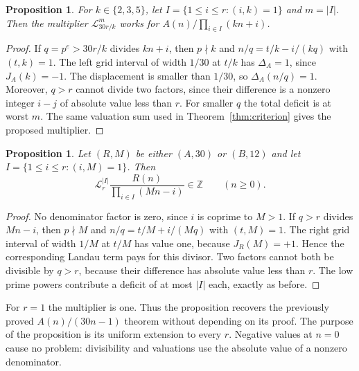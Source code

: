 \documentclass[11pt]{article}
\newtheorem{proposition}[theorem]{Proposition}
\theoremstyle{definition}
\theoremstyle{remark}
\newcommand{\Z}{\mathbb Z}
\newcommand{\LL}{\mathcal L}
\begin{document}
\begin{proposition}\label{prop:positive}
For $k\in\{2,3,5\}$, let $I=\{1\leq i\leq r:(i,k)=1\}$ and
$m=|I|$. Then the multiplier $\LL_{30r/k}^{m}$ works for
$A(n)/\prod_{i\in I}(kn+i)$.
\end{proposition}
\begin{proof}
If $q=p^e>30r/k$ divides $kn+i$, then $p\nmid k$ and
$n/q=t/k-i/(kq)$ with $(t,k)=1$. The left grid interval of width
$1/30$ at $t/k$ has $\Delta_A=1$, since $J_A(k)=-1$. The displacement
is smaller than $1/30$, so $\Delta_A(n/q)=1$.
Moreover, $q>r$ cannot divide two factors, since their difference is
a nonzero integer $i-j$ of absolute value less than $r$.
For smaller $q$ the total deficit is at worst $m$. The same valuation
sum used in Theorem~\ref{thm:criterion} gives the proposed multiplier.
\end{proof}

\begin{proposition}\label{prop:negative}
Let $(R,M)$ be either $(A,30)$ or $(B,12)$ and let
$I=\{1\leq i\leq r:(i,M)=1\}$. Then
\begin{equation}\label{eq:negativeboth}
 \LL_r^{|I|}\frac{R(n)}{\prod_{i\in I}(Mn-i)}\in\Z
 \qquad(n\geq0).
\end{equation}
\end{proposition}
\begin{proof}
No denominator factor is zero, since $i$ is coprime to $M>1$.
If $q>r$ divides $Mn-i$, then $p\nmid M$ and
$n/q=t/M+i/(Mq)$ with $(t,M)=1$. The right grid interval of width
$1/M$ at $t/M$ has value one, because $J_R(M)=+1$. Hence the
corresponding Landau term pays for this divisor. Two factors cannot
both be divisible by $q>r$, because their difference has absolute
value less than $r$. The low prime powers contribute a deficit of at
most $|I|$ each, exactly as before.
\end{proof}
For $r=1$ the multiplier is one. Thus the proposition recovers the
previously proved $A(n)/(30n-1)$ theorem without depending on its proof.
The purpose of the proposition is its uniform extension to every $r$.
Negative values at $n=0$ cause no problem: divisibility and valuations
use the absolute value of a nonzero denominator.
\end{document}
